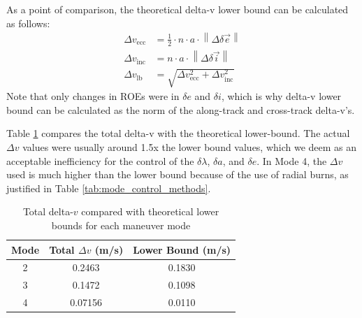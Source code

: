 As a point of comparison, the theoretical delta-v lower bound can be calculated as follows:
\begin{align*}
\Delta v_{\text{ecc}} &= \frac{1}{2} \cdot n \cdot a \cdot \left\| \Delta \delta\vec{e} \right\| \\
\Delta v_{\text{inc}} &= n \cdot a \cdot \left\| \Delta \delta\vec{i} \right\| \\
\Delta v_{\text{lb}} &= \sqrt{\Delta v_{\text{ecc}}^2 + \Delta v_{\text{inc}}^2}
\end{align*}
Note that only changes in ROEs were in $\delta e$ and $\delta i$, which is why delta-v lower bound can be calculated as the norm of the along-track and cross-track delta-v's. 

Table \ref{tab:dv_comparison} compares the total delta-v with the theoretical lower-bound. 
The actual $\Delta v$ values were usually around 1.5x the lower bound values, which we deem as an acceptable inefficiency for the control of the $\delta \lambda$, $\delta a$, and $\delta e$. In Mode 4, the $\Delta v$ used is much higher than the lower bound because of the use of radial burns, as justified in Table \ref{tab:mode_control_methods}.
\begin{table}[h!]
\centering
\begin{tabular}{|c|c|c|}
\hline
\textbf{Mode} & \textbf{Total }$\Delta v$ \textbf{(m/s)} & \textbf{Lower Bound (m/s)} \\
\hline
2 & 0.2463 & 0.1830 \\
3 & 0.1472 & 0.1098 \\
4 & 0.07156 & 0.0110 \\
\hline
\end{tabular}
\caption{Total delta-$v$ compared with theoretical lower bounds for each maneuver mode}
\label{tab:dv_comparison}
\end{table}


